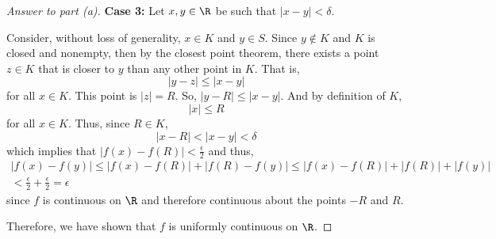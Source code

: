 \documentclass[10pt,twoside]{article}
\begin{document}
\begin{itemize}
\begin{itemize}
\begin{proof}[Answer to part (a)]
        
        \textbf{Case 3:} Let $x,y\in\R$ be such that $|x-y|< \delta$.
        
        Consider, without loss of generality, $x\in K$ and $y\in S$. Since $y\not\in K$ and $K$ is closed and nonempty, then by the closest point theorem, there exists a point $z\in K$ that is closer to $y$ than any other point in $K$. That is, 
        \[|y - z|\leq |x-y|\] for all $x\in K$. This point is $|z| = R$. So, $|y - R|\leq |x-y|$. And by definition of $K$, 
        \[|x|\leq R\] for all $x\in K$. Thus, since $R\in K$,
        \[|x - R|< |x - y| < \delta\]
        which implies that $|f(x) - f(R)| < \frac{\epsilon}{2}$ and thus,
        \begin{gather*}
            |f(x) - f(y)| \leq |f(x) - f(R)| + |f(R) - f(y)| \leq |f(x) - f(R)| + |f(R)| + |f(y)| \\
             < \frac{\epsilon}{2} + \frac{\epsilon}{2} = \epsilon
        \end{gather*}
        since $f$ is continuous on $\R$ and therefore continuous about the points $-R$ and $R$.\smallskip
        
        Therefore, we have shown that $f$ is uniformly continuous on $\R$.
        \fi
        
        \iffalse
        Consider, without loss of generality, $x\in K$ and $y\in S$. %
        Since $y\not\in K$ and $K$ is closed and nonempty, then by the closest point theorem, there exists a point $z\in K$ that is closer to $y$ than any other point in $K$. That is,
        \[|y - z| \leq |y-x|\]
        for all $x\in K$. For any $y\in S$, let $\delta_y = |y - z|$ where $z\in K$ and is closest to $y\not\in K = S$. Then, if,
        \[|x-y| < \delta_y = |y - z|\]
        then
        \[|f(x) - f(y)| = |f(x)| < |f(z)|\]
        \fi
        
        
        \iffalse
        For all $x,y\in K$, take $\displaystyle\sup_{x,y\in K}|f(x) - f(y)| = M$. This is, $M=\diam(f(K))$. We know such a value exists since  we showed that $K$ is compact and therefore $f(K)$ is compact and thus, $f(K)$ is bounded and has finite diameter. 
        \fi
        \end{proof}
        

\end{itemize}
\end{itemize}
\end{document}
